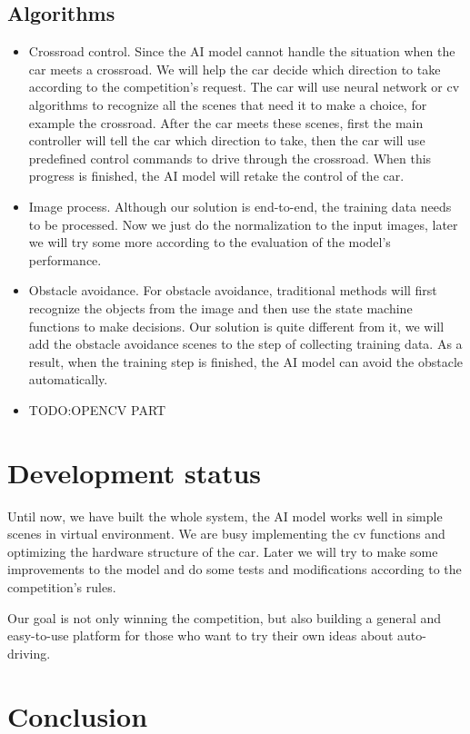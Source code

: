 \documentclass[conference]{IEEEtran}
\begin{document}
\subsection{Algorithms}
\begin{itemize}
\item Crossroad control. Since the AI model cannot handle the situation when the car meets a crossroad. We will help the car decide which direction to take according to the competition's request. The car will use neural network or cv algorithms to recognize all the scenes that need it to make a choice, for example the crossroad. After the car meets these scenes, first the main controller will tell the car which direction to take, then the car will use predefined control commands to drive through the crossroad. When this progress is finished, the AI model will retake the control of the car.
\item Image process. Although our solution is end-to-end, the training data needs to be processed. Now we just do the normalization to the input images, later we will try some more according to the evaluation of the model's performance.
\item Obstacle avoidance. For obstacle avoidance, traditional methods will first recognize the objects from the image and then use the state machine functions to make decisions. Our solution is quite different from it, we will add the obstacle avoidance scenes to the step of collecting training data. As a result, when the training step is finished, the AI model can avoid the obstacle automatically.
\item TODO:OPENCV PART
\end{itemize}

\section{Development status}

Until now, we have built the whole system, the AI model works well in simple scenes in virtual environment. We are busy implementing the cv functions and optimizing the hardware structure of the car. Later we will try to make some improvements to the model and do some tests and modifications according to the competition's rules. 

Our goal is not only winning the competition, but also building a general and easy-to-use platform for those who want to try their own ideas about auto-driving.

\section{Conclusion}
\end{document}
